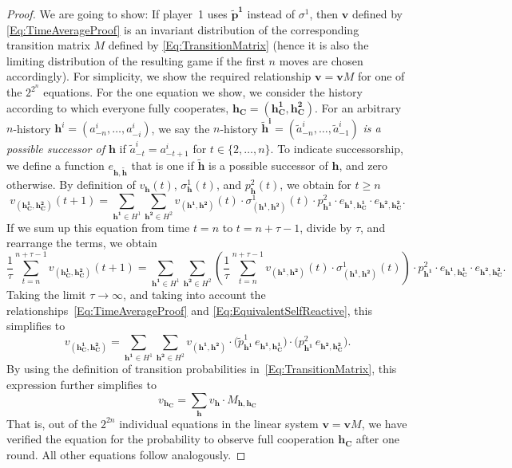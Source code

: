 \documentclass[9pt,twoside,lineno]{pnas-new}
\theoremstyle{plainCl1}
\theoremstyle{plainCl2}
\begin{document}
\begin{proof}
We are going to show: If player~1 uses $\mathbf{\tilde p^1}$ instead of $\sigma^1$, then $\mathbf{v}$ defined by \eqref{Eq:TimeAverageProof} is an invariant distribution of the corresponding transition matrix $M$ defined by \eqref{Eq:TransitionMatrix} (hence it is also the limiting distribution of the resulting game if the first $n$ moves are chosen accordingly). For simplicity, we show the required relationship $\mathbf{v}\!=\!\mathbf{v}M$ for one of the $2^{2^n}$ equations. For the one equation we show, we consider the history according to which everyone fully cooperates, $\mathbf{h_C}\!=\!(\mathbf{h^1_C},\mathbf{ h^2_C})$. For an arbitrary $n$-history $\mathbf{h}^i=(a^i_{-n},\ldots,a^i_{-i})$, we say the $n$-history $\mathbf{\tilde h^i}=(\tilde a^i_{-n},\ldots, \tilde a^i_{-1})$ {\it is a possible successor of $\mathbf{h}$} if $\tilde a^i_{-t} = a^i_{-t+1}$ for $t\!\in\!\{2,\ldots,n\}$. To indicate successorship, we define a function $e_{\mathbf{h},\mathbf{\tilde h}}$ that is one if $\mathbf{\tilde h}$ is a possible successor of $\mathbf{h}$, and zero otherwise. 
By definition of $v_\mathbf{h}(t)$, $\sigma_\mathbf{h}^1(t)$, and $p^2_\mathbf{h}(t)$, we obtain for $t\!\ge\!n$
\begin{equation}
v_{(\mathbf{h^1_C},\mathbf{h^2_C})} (t\!+\!1)
= \sum_{\mathbf{h^1}\in H^1}\sum_{\mathbf{h^2}\in H^2} v_{(\mathbf{h^1},\mathbf{h^2})}(t)\cdot  \sigma^1_{(\mathbf{h^1},\mathbf{h^2})}(t) \cdot p^2_\mathbf{h^1} \cdot e_{\mathbf{h^1},\mathbf{h^1_C}} \cdot e_{\mathbf{h^2},\mathbf{h^2_C}}.
\end{equation}
If we sum up this equation from time $t\!=\!n$ to $t\!=\!n\!+\!\tau\!-\!1$, divide by $\tau$, and rearrange the terms, we obtain
\begin{equation}
\frac{1}{\tau}\sum_{t=n}^{n+\tau-1} v_{(\mathbf{h^1_C},\mathbf{h^2_C})} (t\!+\!1) 
= \sum_{\mathbf{h^1}\in H^1} \sum_{\mathbf{h^2}\in H^2} \left(\frac{1}{\tau}\sum_{t=n}^{n+\tau-1} v_{(\mathbf{h^1},\mathbf{h^2})}(t)\cdot  \sigma^1_{(\mathbf{h^1},\mathbf{h^2})}(t)\right) \cdot p^2_\mathbf{h^1} \cdot e_{\mathbf{h^1},\mathbf{h^1_C}} \cdot e_{\mathbf{h^2},\mathbf{h^2_C}}.
\end{equation}
Taking the limit $\tau\to\infty$, and taking into account the relationships~\eqref{Eq:TimeAverageProof} and \eqref{Eq:EquivalentSelfReactive}, this simplifies to
\begin{equation} 
v_{(\mathbf{h^1_C},\mathbf{h^2_C})}
= \sum_{\mathbf{h^1}\in H^1}\sum_{\mathbf{h^2} \in H^2} v_{(\mathbf{h^1}, \mathbf{h^2})} \cdot \big(\tilde p^1_{\mathbf{h^1}} \, e_{\mathbf{h^1},\mathbf{h^1_C}}\big) \cdot \big(p^2_\mathbf{h^1} \, e_{\mathbf{h^2},\mathbf{h^2_C}}\big).
\end{equation}
By using the definition of transition probabilities in~\eqref{Eq:TransitionMatrix}, this expression further simplifies to
\begin{equation} 
v_\mathbf{h_C} = \sum_{\mathbf{h}} v_{\mathbf{h}} \cdot M_{\mathbf{h},\mathbf{h_C}}
\end{equation}
That is, out of the $2^{2n}$ individual equations in the linear system $\mathbf{v}\!=\!\mathbf{v} M$, we have verified the equation for the probability to observe full cooperation $\mathbf{h_C}$ after one round. All other equations follow analogously.
\end{proof}
\end{document}
